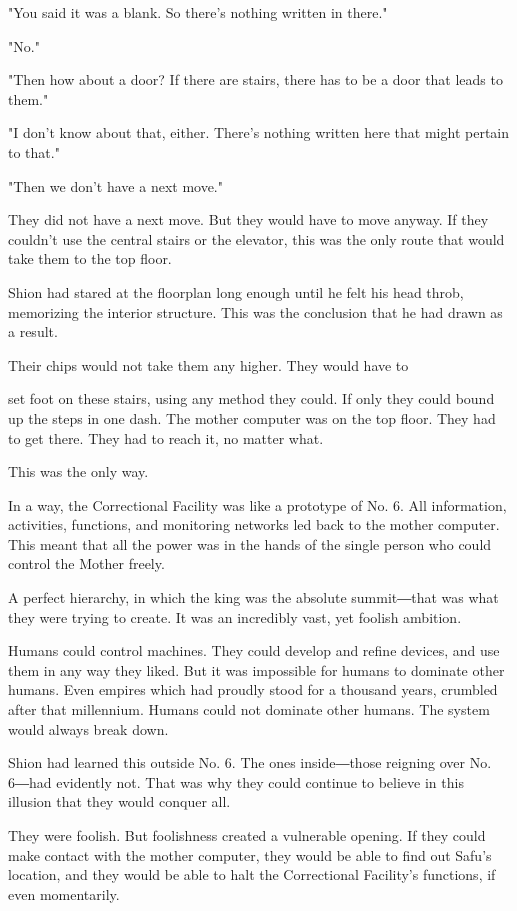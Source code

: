 "You said it was a blank. So there's nothing written in there."

"No."

"Then how about a door? If there are stairs, there has to be a door that
leads to them."

"I don't know about that, either. There's nothing written here that
might pertain to that."

"Then we don't have a next move."

They did not have a next move. But they would have to move anyway. If
they couldn't use the central stairs or the elevator, this was the only
route that would take them to the top floor.

Shion had stared at the floorplan long enough until he felt his head
throb, memorizing the interior structure. This was the conclusion that
he had drawn as a result.

Their chips would not take them any higher. They would have to~

set foot on these stairs, using any method they could. If only they
could bound up the steps in one dash. The mother computer was on the top
floor. They had to get there. They had to reach it, no matter what.

This was the only way.

In a way, the Correctional Facility was like a prototype of No. 6. All
information, activities, functions, and monitoring networks led back to
the mother computer. This meant that all the power was in the hands of
the single person who could control the Mother freely.

A perfect hierarchy, in which the king was the absolute summit―that was
what they were trying to create. It was an incredibly vast, yet foolish
ambition.

Humans could control machines. They could develop and refine devices,
and use them in any way they liked. But it was impossible for humans to
dominate other humans. Even empires which had proudly stood for a
thousand years, crumbled after that millennium. Humans could not
dominate other humans. The system would always break down.

Shion had learned this outside No. 6. The ones inside―those reigning
over No. 6―had evidently not. That was why they could continue to
believe in this illusion that they would conquer all.

They were foolish. But foolishness created a vulnerable opening. If they
could make contact with the mother computer, they would be able to find
out Safu's location, and they would be able to halt the Correctional
Facility's functions, if even momentarily.

